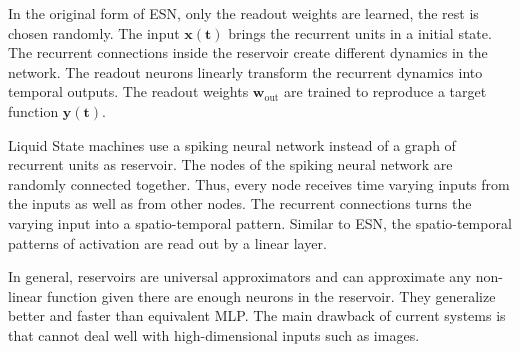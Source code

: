 In the original form of ESN, only the readout weights are learned, the rest is chosen randomly.
The input \(\boldsymbol{x(t)}\) brings the recurrent units in a initial state.
The recurrent connections inside the reservoir create different dynamics in the network.
The readout neurons linearly transform the recurrent dynamics into temporal outputs.
The readout weights \(\boldsymbol{w}_{\text{out}}\) are trained to reproduce a target function \(\boldsymbol{y(t)}\).

Liquid State machines use a spiking neural network instead of a graph of recurrent units as reservoir.
The nodes of the spiking neural network are randomly connected together.
Thus, every node receives time varying inputs from the inputs as well as from other nodes.
The recurrent connections turns the varying input into a spatio-temporal pattern.
Similar to ESN, the spatio-temporal patterns of activation are read out by a linear layer.

In general, reservoirs are universal approximators and can approximate any non-linear function given there are enough neurons in the reservoir.
They generalize better and faster than equivalent MLP.
The main drawback of current systems is that cannot deal well with high-dimensional inputs such as images.








